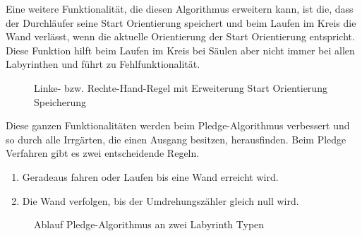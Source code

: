 Eine weitere Funktionalität, die diesen Algorithmus erweitern kann, ist die, dass der Durchläufer seine Start Orientierung speichert und beim Laufen im Kreis die Wand verlässt, wenn die aktuelle Orientierung der Start Orientierung entspricht. Diese Funktion hilft beim Laufen im Kreis bei Säulen aber nicht immer bei allen Labyrinthen und führt zu Fehlfunktionalität.
\begin{figure}[H]
  \centering
  \qquad
  \caption{Linke- bzw. Rechte-Hand-Regel mit Erweiterung Start Orientierung Speicherung}
  \label{fig:StartorientierungSpeicherung}
\end{figure}
Diese ganzen Funktionalitäten werden beim Pledge-Algorithmus verbessert und so durch alle Irrgärten, die einen Ausgang besitzen, herausfinden. Beim Pledge Verfahren gibt es zwei entscheidende Regeln.
\begin{enumerate}
    \item Geradeaus fahren oder Laufen bis eine Wand erreicht wird.
    \item Die Wand verfolgen, bis der Umdrehungszähler gleich null wird. 
\end{enumerate}

\begin{figure}[H]
  \centering
  \qquad
  \caption{Ablauf Pledge-Algorithmus an zwei Labyrinth Typen}
  \label{fig:PledgeAlgo}
\end{figure}

